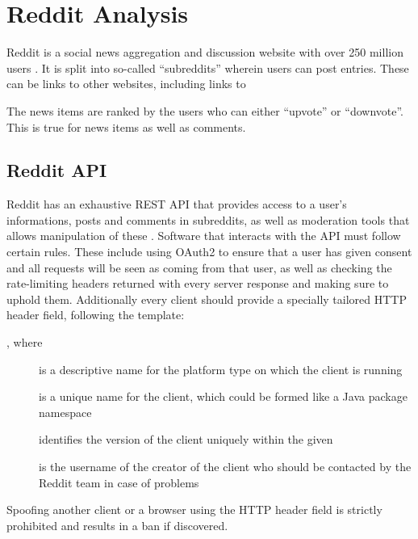 \section{Reddit Analysis}\label{sec:reddit-analysis}

Reddit is a social news aggregation and discussion website with over 250 million users \citep{AdvertiseOnReddit}.
It is split into so-called ``subreddits'' wherein users can post entries.
These can be links to other websites, including links to \nl

The news items are ranked by the users who can either ``upvote'' or ``downvote''.
This is true for news items as well as comments. \citep{AboutReddit}\nl


\subsection{Reddit API}\label{subsec:reddit-api}

Reddit has an exhaustive \ac{REST} \ac{API} that provides access to a user's informations, posts and comments in
subreddits, as well as moderation tools that allows manipulation of these \citep{RedditApi}.
Software that interacts with the \ac{API} must follow certain rules.
These include using OAuth2 to ensure that a user has given consent and all requests will be seen as coming from that
user, as well as checking the rate-limiting headers returned with every server response and making sure to uphold them.
Additionally every client should provide a specially tailored  \ac{HTTP} header field, following the
template: \citep{RedditApiRules}\nl

\begin{center}
  , where
\end{center}\nl

\begin{description}
  \item[] is a descriptive name for the platform type on which the client is running
  \item[] is a unique name for the client, which could be formed like a Java package namespace
  \item[] identifies the version of the client uniquely within the given 
  \item[] is the username of the creator of the client who should be contacted by the Reddit team
  in case of problems
\end{description}\nl

Spoofing another client or a browser using the  \ac{HTTP} header field is strictly prohibited and
results in a ban if discovered. \citep{RedditApiRules}\nl
